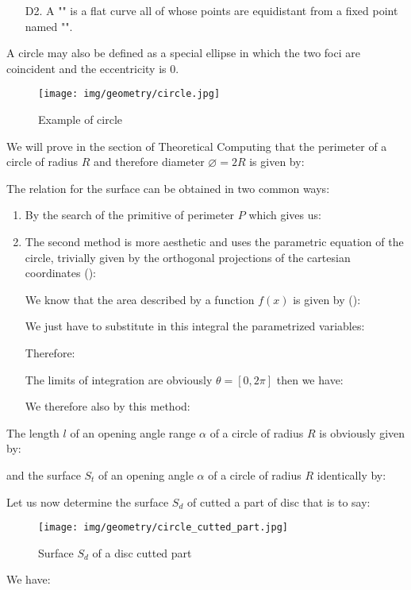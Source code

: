 {\begin{enumerate}
		\item[D2.] A "" is a flat curve all of whose points are equidistant from a fixed point named "".
	\end{enumerate}
	
	\begin{tcolorbox}[title=Remark,colframe=black,arc=10pt]
	A circle may also be defined as a special ellipse in which the two foci are coincident and the eccentricity is $0$.
	\end{tcolorbox}
	
	\begin{figure}[H]
		\centering
		\texttt{[image: img/geometry/circle.jpg]}
		\caption{Example of circle}
	\end{figure}
	We will prove in the section of Theoretical Computing that the perimeter of a circle of radius $R$ and therefore diameter $\varnothing =2R$ is given by:
	
	The relation for the surface can be obtained in two common ways:
	\begin{enumerate}
		\item By the search of the primitive of perimeter $P$ which gives us:
		
		
		\item The second method is more aesthetic and uses the parametric equation of the circle, trivially given by the orthogonal projections of the cartesian coordinates ():
		
		We know that the area described by a function $f (x)$ is given by ():
		
		We just have to substitute in this integral the parametrized variables:
		
		Therefore:
		
		The limits of integration are obviously $\theta=[0,2\pi]$ then we have:
		
		We therefore also by this method:
		
	\end{enumerate}
	The length $l$ of an opening angle range $\alpha$ of a circle of radius $R$ is obviously given by:
		
		and the surface $S_t$ of an opening angle $\alpha$ of a circle of radius $R$ identically by:
		
		Let us now determine the surface $S_d$ of cutted a part of disc that is to say:
		\begin{figure}[H]
			\centering
			\texttt{[image: img/geometry/circle\_cutted\_part.jpg]}
			\caption{Surface $S_d$ of a disc cutted part}
		\end{figure}
		We have:
		
}
